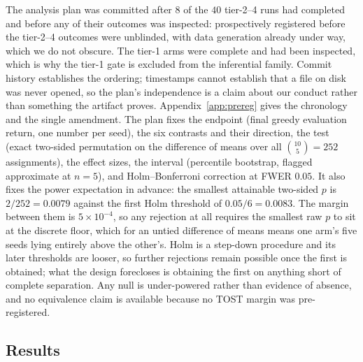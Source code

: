 The analysis plan was committed after $8$ of the $40$ tier-2--4 runs had
completed and before any of their outcomes was inspected: prospectively
registered before the tier-2--4 outcomes were unblinded, with data generation
already under way, which we do not obscure. The tier-1 arms were complete and
had been inspected, which is why the tier-1 gate is excluded from the
inferential family. Commit history establishes the ordering; timestamps cannot
establish that a file on disk was never opened, so the plan's independence is a
claim about our conduct rather than something the artifact proves.
Appendix~\ref{app:prereg} gives the chronology and the single amendment. The
plan fixes the
endpoint (final greedy evaluation return, one number per seed), the six
contrasts and their direction, the test (exact two-sided permutation on the
difference of means over all $\binom{10}{5} = 252$ assignments), the effect
sizes, the interval (percentile bootstrap, flagged approximate at $n{=}5$), and
Holm--Bonferroni correction at FWER $0.05$. It also fixes the power expectation
in advance: the smallest attainable two-sided $p$ is $2/252 = 0.0079$ against
the first Holm threshold of $0.05/6 = 0.0083$. The margin between them is
$5\times10^{-4}$, so any rejection at all requires the smallest raw $p$ to sit
at the discrete floor, which for an untied difference of means means one arm's
five seeds lying entirely above the other's. Holm is a step-down procedure and
its later thresholds are looser, so further rejections remain possible once the
first is obtained; what the design forecloses is obtaining the first on
anything short of complete separation. Any null is
under-powered rather than evidence of absence, and no equivalence claim is
available because no TOST margin was pre-registered.

\subsection{Results}

